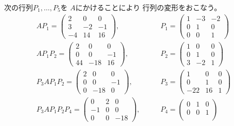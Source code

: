 \documentclass[12pt,b5paper]{ltjsarticle}
\begin{document}
\begin{enumerate}
      次の行列$P_{1},\dots,P_{5}$を
      $A$にかけることにより
      行列の変形をおこなう。
      \begin{align}
       A P_{1} =
        \begin{pmatrix}
         2 & 0 & 0 \\
         3 & -2 & -1 \\
         -4 & 14 & 16
        \end{pmatrix},
        &\qquad
        P_{1} =
        \begin{pmatrix}
         1 & -3 & -2 \\
         0 & 1 & 0 \\
         0 & 0 & 1
        \end{pmatrix}
       \\
       A P_{1} P_{2} =
        \begin{pmatrix}
         2 & 0 & 0 \\
         0 & 0 & -1 \\
         44 & -18 & 16
        \end{pmatrix},
        &\qquad
        P_{2} =
        \begin{pmatrix}
         1 & 0 & 0 \\
         0 & 1 & 0 \\
         3 & -2 & 1
        \end{pmatrix}
       \\
       P_{3} A P_{1} P_{2}=
        \begin{pmatrix}
         2 & 0 & 0 \\
         0 & 0 & -1 \\
         0 & -18 & 0
        \end{pmatrix},
        &\qquad
        P_{3} =
        \begin{pmatrix}
         1 & 0 & 0 \\
         0 & 1 & 0 \\
         -22 & 16 & 1
        \end{pmatrix}
       \\
       P_{3} A P_{1} P_{2} P_{4}=
        \begin{pmatrix}
         0 & 2 & 0 \\
         -1 & 0 & 0 \\
         0 & 0 & -18
        \end{pmatrix},
        &\qquad
        P_{4} =
        \begin{pmatrix}
         0 & 1 & 0 \\
         0 & 0 & 1 \\

\end{pmatrix}
\end{align}
\end{enumerate}
\end{document}
